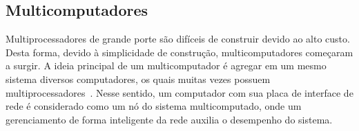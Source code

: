 %
%
%
%
%
%
%
%
%
\subsection{Multicomputadores}

%
%
%
%
Multiprocessadores de grande porte são difíceis de construir devido ao alto
custo. Desta forma, devido à simplicidade de construção, multicomputadores
começaram a surgir. A ideia principal de um multicomputador é agregar em um mesmo sistema diversos
computadores, os quais muitas vezes possuem multiprocessadores~\cite{Tanenbaum2015}.
Nesse sentido, um computador com sua placa de interface de rede é considerado como um nó do
sistema multicomputado, onde um gerenciamento de forma inteligente da rede auxilia o desempenho
do sistema.

